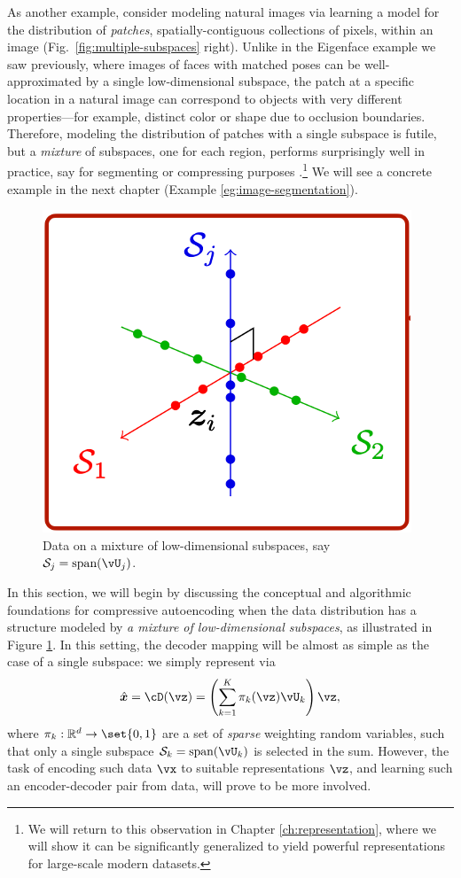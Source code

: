 \documentclass[../../book-main.tex]{subfiles}
\begin{document}
As another example, consider modeling natural images via learning a model for the distribution of \textit{patches}, spatially-contiguous collections of pixels, within an image (Fig.\ \ref{fig:multiple-subspaces} right). Unlike in the Eigenface example we saw previously, where images of faces with matched poses can be well-approximated by a single low-dimensional subspace, the patch at a specific location in a natural image can correspond to objects with very different properties---for example, distinct color or shape due to occlusion boundaries. Therefore, modeling the distribution of patches with a single subspace is futile, but a \textit{mixture} of subspaces, one for each region, performs surprisingly well in practice, say for segmenting or compressing purposes \cite{Mobahi-IJCV2011}.\footnote{We will return to this observation in Chapter \ref{ch:representation}, where we will show it can be significantly generalized to yield powerful representations for large-scale modern datasets.} We will see a concrete example in the next chapter (Example \ref{eg:image-segmentation}).



\begin{figure}
    \centering
    \includegraphics[height=0.35\linewidth]{chapters/subspaces.png}
    \caption{Data on a mixture of low-dimensional subspaces, say $\mathcal{S}_j = \mbox{span}(\vU_j)$.}
    \label{fig:subspaces}
\end{figure}

In this section, we will begin by discussing the conceptual and algorithmic foundations for compressive autoencoding when the data distribution has a structure modeled by {\em a mixture of low-dimensional subspaces}, as illustrated in Figure \ref{fig:subspaces}. In this setting, the decoder mapping will be almost as simple as the case of a single subspace: we simply represent via
\begin{equation}\label{eq:mixture-subspaces-decoder-first-cut}
    \hat{\x} = \cD(\vz) = \left( \sum_{k=1}^K \pi_k(\vz)\vU_k \right) \vz,
\end{equation}
where $\pi_k : \R^d \to \set{0,1}$ are a set of \textit{sparse} weighting random variables, such that only a single subspace $\mathcal{S}_k = \mbox{span}(\vU_k) $ is selected in the sum.
However, the task of encoding such data $\vx$ to suitable representations $\vz$, and learning such an encoder-decoder pair from data, will prove to be more involved.
\end{document}
